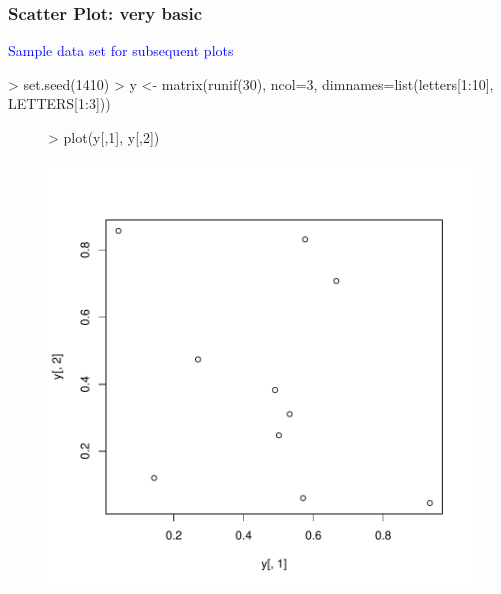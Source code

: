 \documentclass{beamer}
\begin{document}
\begin{frame}[containsverbatim]  
	\frametitle{Scatter Plot: very basic}
\scriptsize
\textcolor{blue}{Sample data set for subsequent plots}
\begin{Schunk}
\begin{Sinput}
> set.seed(1410)
> y <- matrix(runif(30), ncol=3, dimnames=list(letters[1:10], LETTERS[1:3]))
\end{Sinput}
\end{Schunk}
\begin{figure}
  \centering
\begin{Schunk}
\begin{Sinput}
> plot(y[,1], y[,2]) 
\end{Sinput}
\end{Schunk}
\includegraphics{fig--002}
\label{fig:base_scatter}
\end{figure}
\end{frame}
\end{document}
